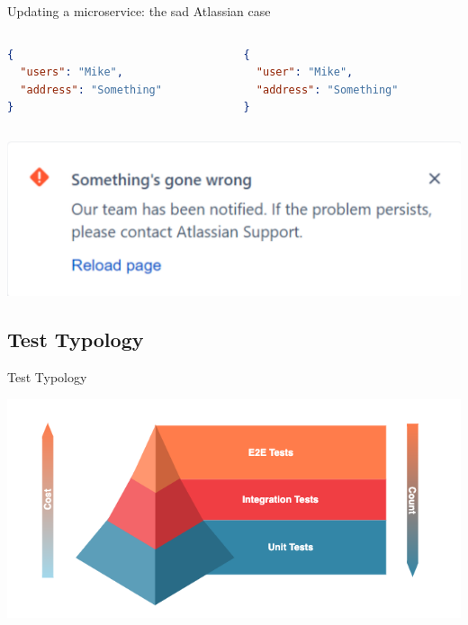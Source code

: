 \begin{frame}[fragile]{Updating a microservice: the sad Atlassian case}

  \begin{columns}
    \begin{column}{0.5\textwidth}
      \begin{lstlisting}[language=json]
{
  "users": "Mike",
  "address": "Something"
}
      \end{lstlisting}
    \end{column}
    \begin{column}{0.5\textwidth}
        \begin{lstlisting}[language=json]
{
  "user": "Mike",
  "address": "Something"
}
        \end{lstlisting}
    \end{column}
  \end{columns}
\begin{center}
  \includegraphics[scale=.4]{./assets/atlassian}
\end{center}
\end{frame}

\subsection{Test Typology}

\begin{frame}{Test Typology}
  \begin{center}
    \includegraphics[scale=.6]{./assets/test_pyramid}
  \end{center}
\end{frame}

